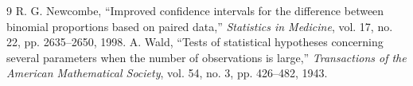 \documentclass[10pt,a4paper]{article}
\begin{document}
\begin{thebibliography}{9}
 R. G. Newcombe, ``Improved confidence intervals for the difference between binomial proportions based on paired data,'' \textit{Statistics in Medicine}, vol. 17, no. 22, pp. 2635--2650, 1998.
 A. Wald, ``Tests of statistical hypotheses concerning several parameters when the number of observations is large,'' \textit{Transactions of the American Mathematical Society}, vol. 54, no. 3, pp. 426--482, 1943.
\end{thebibliography}
\end{document}
